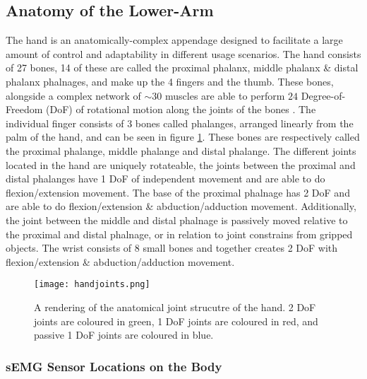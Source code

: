 \documentclass[../main.tex]{subfiles}
\begin{document}
\subsection{Anatomy of the Lower-Arm}
\label{sec:anatomy}

The hand is an anatomically-complex appendage designed to facilitate a large amount of control and adaptability in different usage scenarios.
The hand consists of 27 bones, 14 of these are called the \gls{proximal phalanx}, \gls{middle phalanx} \& \gls{distal phalanx} phalnages, and make up the 4 fingers and the thumb.
These bones, alongside a complex network of $\sim30$ muscles are able to perform $24$ Degree-of-Freedom (DoF) of rotational motion along the joints of the bones \cite{anatomy}.
The individual finger consists of 3 bones called \gls{phalanges}, arranged linearly from the palm of the hand, and can be seen in figure \ref{fig:anatomy}.
These bones are respectively called the proximal phalange, middle phalange and distal phalange.
The different joints located in the hand are uniquely rotateable,
the joints between the proximal and distal phalanges have 1 DoF of independent movement and are able to do \gls{flexion/extension} movement.
The base of the proximal phalnage has 2 DoF and are able to do \gls{flexion/extension} \& \gls{abduction/adduction} movement.
Additionally, the joint between the middle and distal phalnage is passively moved relative to the proximal and distal phalnage, or in relation to joint constrains from gripped objects.
The wrist consists of 8 small bones and together creates 2 DoF with \gls{flexion/extension} \& \gls{abduction/adduction} movement.


\begin{figure}[H]
\begin{center}
\texttt{[image: handjoints.png]}
\caption{A rendering of the anatomical joint strucutre of the hand. 2 DoF joints are coloured in green, 1 DoF joints are coloured in red, and passive 1 DoF joints are coloured in blue.}
\label{fig:anatomy}
\end{center}
\end{figure}

\subsubsection{sEMG Sensor Locations on the Body}
\label{sec:muscleplacements}
\end{document}
